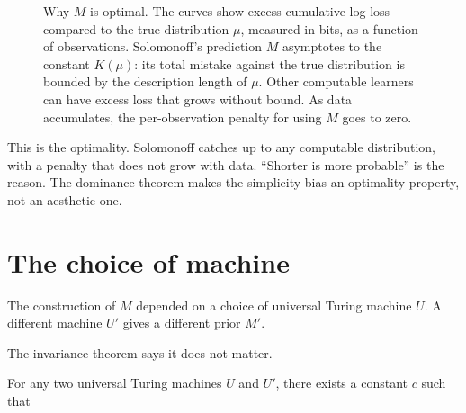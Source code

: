\begin{figure}[h]
\centering
{}
\caption{Why $M$ is optimal. The curves show excess cumulative log-loss compared to the true distribution $\mu$, measured in bits, as a function of observations. Solomonoff's prediction $M$ asymptotes to the constant $K(\mu)$: its total mistake against the true distribution is bounded by the description length of $\mu$. Other computable learners can have excess loss that grows without bound. As data accumulates, the per-observation penalty for using $M$ goes to zero.}
\label{fig:dominance}
\end{figure}

This is the optimality. Solomonoff catches up to any computable distribution, with a penalty that does not grow with data. ``Shorter is more probable'' is the reason. The dominance theorem makes the simplicity bias an optimality property, not an aesthetic one.

\section*{The choice of machine}

The construction of $M$ depended on a choice of universal Turing machine $U$. A different machine $U'$ gives a different prior $M'$.

The invariance theorem says it does not matter.

For any two universal Turing machines $U$ and $U'$, there exists a constant $c$ such that

